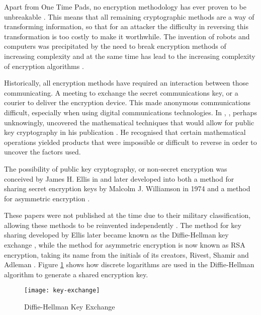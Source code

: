\documentclass{ecuthesis}
\begin{document}
Apart from One Time Pads, no encryption methodology has ever proven to be
unbreakable \parencite{Shannon:1948p6583}. This means that all remaining
cryptographic methods are a way of transforming information, so that for an
attacker the difficulty in reversing this transformation is too costly to make
it worthwhile. The invention of robots and computers was precipitated by the
need to break encryption methods of increasing complexity and at the same time
has lead to the increasing complexity of encryption algorithms
\parencite{Kahn:1974:C}.

Historically, all encryption methods have required an interaction between those
communicating. A meeting to exchange the secret communications key, or a
courier to deliver the encryption device. This made anonymous communications
difficult, especially when using digital communications technologies.  In
\citeyear{Jevons:1874vn}, \citeauthor{Jevons:1874vn}, perhaps
unknowingly, uncovered the mathematical techniques that would allow for public
key cryptography in his publication . He recognised
that certain mathematical operations yielded products that were impossible or
difficult to reverse in order to uncover the factors used.

The possibility of public key cryptography, or non-secret encryption was
conceived by James H. Ellis in \citeyear{Ellis:1970p3249} and later developed
into both a method for sharing secret encryption keys by Malcolm J. Williamson
in 1974 \parencite{Singh:1999:CBE} and a method for asymmetric encryption
\parencite{Cocks:1973p3265}.

These papers were not published at the time due to their military
classification, allowing these methods to be reinvented independently
\parencite{Singh:1999:CBE}. The method for key sharing developed by Ellis
later became known as the Diffie-Hellman key exchange
\parencite{Diffie:1976p585}, while the method for asymmetric encryption is now
known as RSA encryption, taking its name from the initials of its creators,
Rivest, Shamir and Adleman \parencite{Rivest:1978p708}. Figure
\ref{key-exchange} shows how discrete logarithms are used in the Diffie-Hellman
algorithm to generate a shared encryption key.

\begin{figure}[H]
  \centering\texttt{[image: key-exchange]}
  \caption{Diffie-Hellman Key Exchange}
  \label{key-exchange}
\end{figure}

\end{document}

